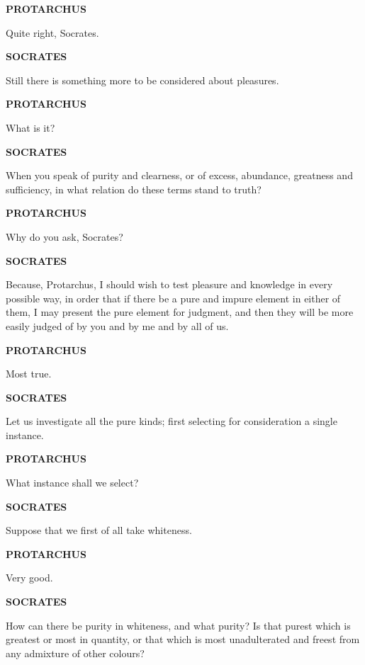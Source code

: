 \documentclass[11pt,letter]{article}
\begin{document}
\par \textbf{PROTARCHUS}
\par   Quite right, Socrates.

\par \textbf{SOCRATES}
\par   Still there is something more to be considered about pleasures.

\par \textbf{PROTARCHUS}
\par   What is it?

\par \textbf{SOCRATES}
\par   When you speak of purity and clearness, or of excess, abundance, greatness and sufficiency, in what relation do these terms stand to truth?

\par \textbf{PROTARCHUS}
\par   Why do you ask, Socrates?

\par \textbf{SOCRATES}
\par   Because, Protarchus, I should wish to test pleasure and knowledge in every possible way, in order that if there be a pure and impure element in either of them, I may present the pure element for judgment, and then they will be more easily judged of by you and by me and by all of us.

\par \textbf{PROTARCHUS}
\par   Most true.

\par \textbf{SOCRATES}
\par   Let us investigate all the pure kinds; first selecting for consideration a single instance.

\par \textbf{PROTARCHUS}
\par   What instance shall we select?

\par \textbf{SOCRATES}
\par   Suppose that we first of all take whiteness.

\par \textbf{PROTARCHUS}
\par   Very good.

\par \textbf{SOCRATES}
\par   How can there be purity in whiteness, and what purity? Is that purest which is greatest or most in quantity, or that which is most unadulterated and freest from any admixture of other colours?
\end{document}
